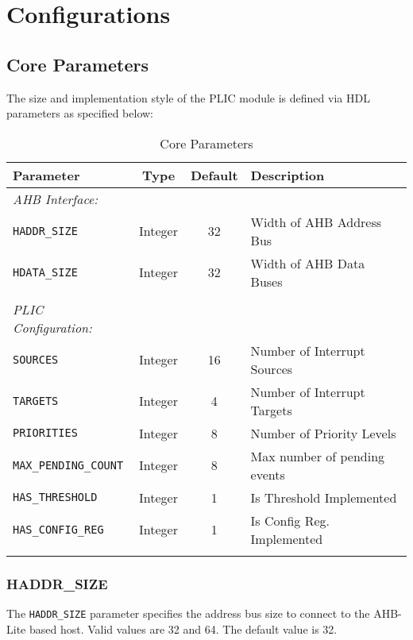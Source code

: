 \chapter{Configurations}

\hypertarget{core-parameters}{\section{Core Parameters}\label{sec:core-parameters}}

The size and implementation style of the PLIC module is defined via HDL
parameters as specified below:

\begin{longtable}[c]{@{\extracolsep{\fill}}lccl@{}}	
	\toprule 
	\textbf{Parameter}           & \textbf{Type} & \textbf{Default} & \textbf{Description}\\
	\midrule
	\endhead
	\emph{AHB Interface:}\\
	\texttt{HADDR\_SIZE}         & Integer & 32 & Width of AHB Address Bus\\
	\texttt{HDATA\_SIZE}         & Integer & 32 & Width of AHB Data Buses\\
	& & & \\
	\emph{PLIC Configuration:}\\
	\texttt{SOURCES}             & Integer & 16 & Number of Interrupt Sources\\
	\texttt{TARGETS}             & Integer & 4 & Number of Interrupt Targets\\
	\texttt{PRIORITIES}          & Integer & 8 & Number of Priority Levels\\
	\texttt{MAX\_PENDING\_COUNT} & Integer & 8 & Max number of pending events\\
	\texttt{HAS\_THRESHOLD}      & Integer & 1 & Is Threshold Implemented\\
	\texttt{HAS\_CONFIG\_REG}    & Integer & 1 & Is Config Reg. Implemented\\
	\bottomrule 	
	\caption{Core Parameters}
	\label{tab:CoreParams}
\end{longtable}

\subsection{HADDR\_SIZE}

The \texttt{HADDR\_SIZE} parameter specifies the address bus size to
connect to the AHB-Lite based host. Valid values are 32 and 64. The
default value is 32.

